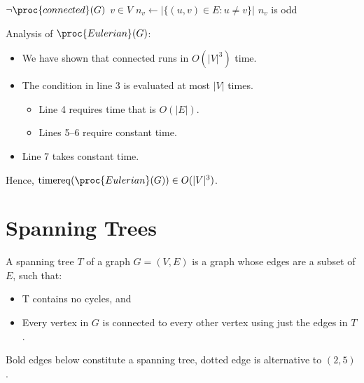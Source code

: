 \documentclass[a4paper]{report}
\newcommand{\bookref}[3]{\marginpar{\faBook{}~#1\\Chapter #2\\Section #3}}
\theoremstyle{definition}
\DeclareMathOperator*{\treq}{timereq}
\begin{document}
\begin{codebox}
\li \If $\neg \proc{connected}(G)$
\li \Then \Return {}
\End
\li \For $v \in V$ \Do
  \li $n_v \gets \left| \{ (u,v) \in E : u \neq v \} \right|$
  \li \If $n_v$ is odd
    \li \Then \Return {}
  \End
\End
\li \Return {}
\end{codebox}

Analysis of $\proc{Eulerian}(G)$:

\begin{itemize}
\item We have shown that connected runs in $O(|V|^3)$ time.
\item The condition in line 3 is evaluated at most $|V|$ times.
\begin{itemize}
\item Line 4 requires time that is $O(|E|)$.
\item Lines 5--6 require constant time.
\end{itemize}
\item Line 7 takes constant time.
\end{itemize}


Hence, $\treq(\proc{Eulerian}(G)) \in O(|V|^3)$.

\section{Spanning Trees}
\bookref{ER}{28}{28.1.6}
A spanning tree $T$ of a graph $G = (V,E)$ is a graph whose edges are a subset of $E$, such that: 
\begin{itemize}
\item T contains no cycles, and
\item Every vertex in $G$ is connected to every other vertex using just the edges in $T$.
\end{itemize}

Bold edges below constitute a spanning tree, dotted edge is alternative to $(2,5)$.

\begin{center}
% 

\end{center}
\end{document}
